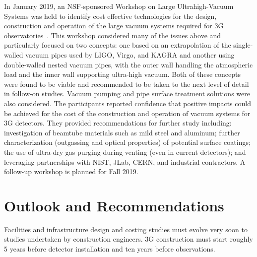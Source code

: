 In January 2019, an NSF-sponsored Workshop on Large Ultrahigh-Vacuum Systems was held to identify cost effective technologies for the design, construction and operation of the large vacuum systems required for 3G observatories~\cite{LLOVacWorkshop2019}. This workshop considered many of the issues above and particularly focused on two concepts: one based on an extrapolation of the single-walled vacuum pipes used by LIGO, Virgo, and KAGRA and another using double-walled nested vacuum pipes, with the outer wall handling the atmospheric load and the inner wall supporting ultra-high vacuum. Both of these concepts were found to be viable and recommended to be taken to the next level of detail in follow-on studies. Vacuum pumping and pipe surface treatment solutions were also considered. The participants reported confidence that positive impacts could be achieved for the cost of the construction and operation of vacuum systems for 3G detectors. They provided recommendations for further study including: investigation of beamtube materials such as mild steel and aluminum; further characterization (outgassing and optical properties) of potential surface coatings; the use of ultra-dry gas purging during venting (even in current detectors); and leveraging partnerships with NIST, JLab, CERN, and industrial contractors. A follow-up workshop is planned for Fall 2019.

\section{Outlook and Recommendations}
Facilities and infrastructure design and costing studies must evolve very soon to studies undertaken by construction engineers. 
3G construction must start roughly 5 years before detector installation and ten years before observations. 

